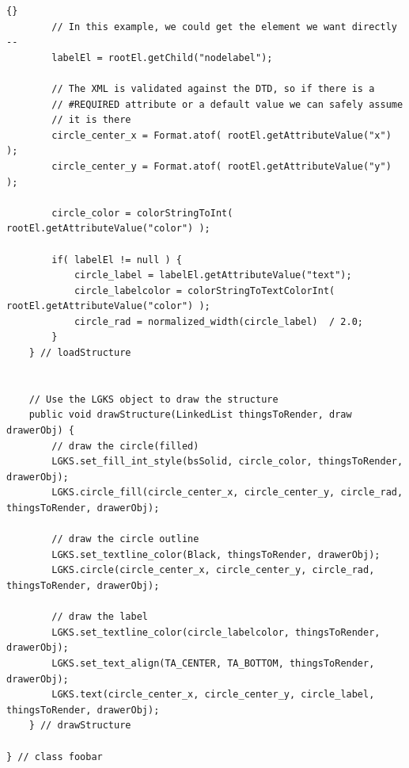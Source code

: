 \documentclass[11pt,letterpaper]{book}
\begin{document}
\begin{lstlisting}{}
        // In this example, we could get the element we want directly --
        labelEl = rootEl.getChild("nodelabel");
        
        // The XML is validated against the DTD, so if there is a
        // #REQUIRED attribute or a default value we can safely assume
        // it is there
        circle_center_x = Format.atof( rootEl.getAttributeValue("x") );
        circle_center_y = Format.atof( rootEl.getAttributeValue("y") );

        circle_color = colorStringToInt( rootEl.getAttributeValue("color") );

        if( labelEl != null ) {
            circle_label = labelEl.getAttributeValue("text");
            circle_labelcolor = colorStringToTextColorInt( rootEl.getAttributeValue("color") );
            circle_rad = normalized_width(circle_label)  / 2.0;
        }
    } // loadStructure


    // Use the LGKS object to draw the structure
    public void drawStructure(LinkedList thingsToRender, draw drawerObj) {
        // draw the circle(filled)
        LGKS.set_fill_int_style(bsSolid, circle_color, thingsToRender, drawerObj);
        LGKS.circle_fill(circle_center_x, circle_center_y, circle_rad, thingsToRender, drawerObj);

        // draw the circle outline
        LGKS.set_textline_color(Black, thingsToRender, drawerObj);
        LGKS.circle(circle_center_x, circle_center_y, circle_rad, thingsToRender, drawerObj);

        // draw the label
        LGKS.set_textline_color(circle_labelcolor, thingsToRender, drawerObj);
        LGKS.set_text_align(TA_CENTER, TA_BOTTOM, thingsToRender, drawerObj);
        LGKS.text(circle_center_x, circle_center_y, circle_label, thingsToRender, drawerObj);
    } // drawStructure

} // class foobar
\end{lstlisting}
\end{document}
